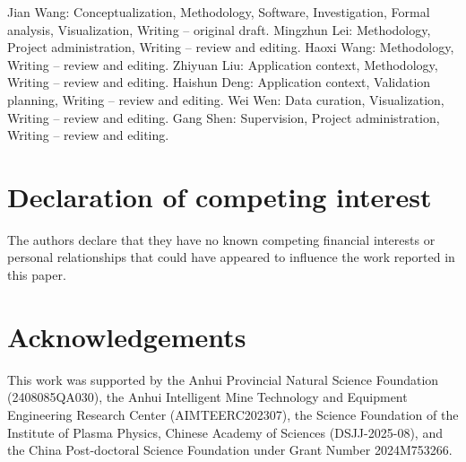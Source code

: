\documentclass[preprint,12pt,authoryear]{elsarticle}
\begin{document}
Jian Wang: Conceptualization, Methodology, Software, Investigation, Formal analysis, Visualization, Writing -- original draft. Mingzhun Lei: Methodology, Project administration, Writing -- review and editing. Haoxi Wang: Methodology, Writing -- review and editing. Zhiyuan Liu: Application context, Methodology, Writing -- review and editing. Haishun Deng: Application context, Validation planning, Writing -- review and editing. Wei Wen: Data curation, Visualization, Writing -- review and editing. Gang Shen: Supervision, Project administration, Writing -- review and editing.

\section*{Declaration of competing interest}

The authors declare that they have no known competing financial interests or personal relationships that could have appeared to influence the work reported in this paper.

\section*{Acknowledgements}

This work was supported by the Anhui Provincial Natural Science Foundation (2408085QA030), the Anhui Intelligent Mine Technology and Equipment Engineering Research Center (AIMTEERC202307), the Science Foundation of the Institute of Plasma Physics, Chinese Academy of Sciences (DSJJ-2025-08), and the China Post-doctoral Science Foundation under Grant Number 2024M753266.



\end{document}
